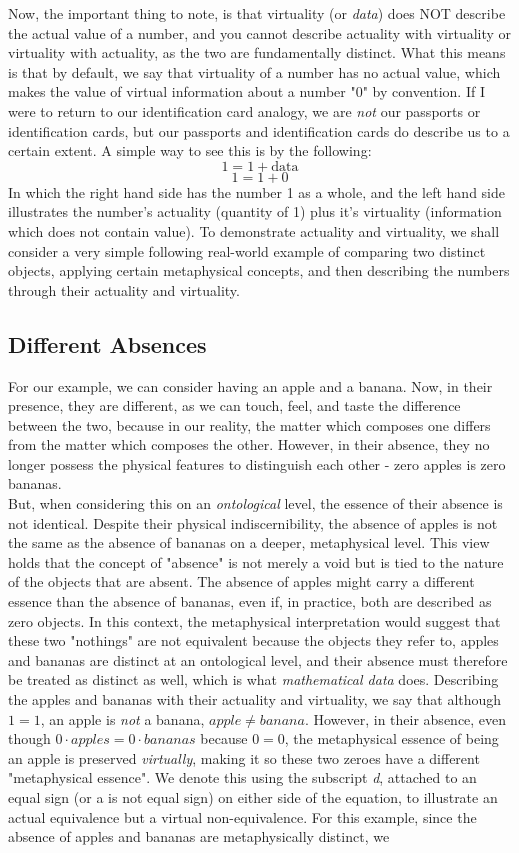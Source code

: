 \documentclass{article}
\begin{document}
Now, the important thing to note, is that virtuality (or \textit{data}) does NOT describe the actual value of a number, and you cannot describe actuality with virtuality or virtuality with actuality, as the two are fundamentally distinct. What this means is that by default, we say that virtuality of a number has no actual value, which makes the value of virtual information about a number "0" by convention. If I were to return to our identification card analogy, we are \textit{not} our passports or identification cards, but our passports and identification cards do describe us to a certain extent. A simple way to see this is by the following:$$1=1+\text{data}$$ $$1=1+0$$ In which the right hand side has the number 1 as a whole, and the left hand side illustrates the number's actuality (quantity of 1) plus it's virtuality (information which does not contain value). To demonstrate actuality and virtuality, we shall consider a very simple following real-world example of comparing two distinct objects, applying certain metaphysical concepts, and then describing the numbers through their actuality and virtuality. \\ \subsection{Different Absences}For our example, we can consider having an apple and a banana. Now, in their presence, they are different, as we can touch, feel, and taste the difference between the two, because in our reality, the matter which composes one differs from the matter which composes the other. However, in their absence, they no longer possess the physical features to distinguish each other - zero apples is zero bananas.\\ But, when considering this on an \textit{ontological} level, the essence of their absence is not identical. Despite their physical indiscernibility, the absence of apples is not the same as the absence of bananas on a deeper, metaphysical level. This view holds that the concept of "absence" is not merely a void but is tied to the nature of the objects that are absent. The absence of apples might carry a different essence than the absence of bananas, even if, in practice, both are described as zero objects. In this context, the metaphysical interpretation would suggest that these two "nothings" are not equivalent because the objects they refer to, apples and bananas are distinct at an ontological level, and their absence must therefore be treated as distinct as well, which is what \textit{mathematical data} does. Describing the apples and bananas with their actuality and virtuality, we say that although $1=1$, an apple is \textit{not} a banana, $apple \neq banana$. However, in their absence, even though $0\cdot apples=0\cdot bananas$ because $0=0$, the metaphysical essence of being an apple is preserved \textit{virtually}, making it so these two zeroes have a different "metaphysical essence". We denote this using the subscript \textit{d}, attached to an equal sign (or a is not equal sign) on either side of the equation, to illustrate an actual equivalence but a virtual non-equivalence. For this example, since the absence of apples and bananas are metaphysically distinct, we 
\end{document}
